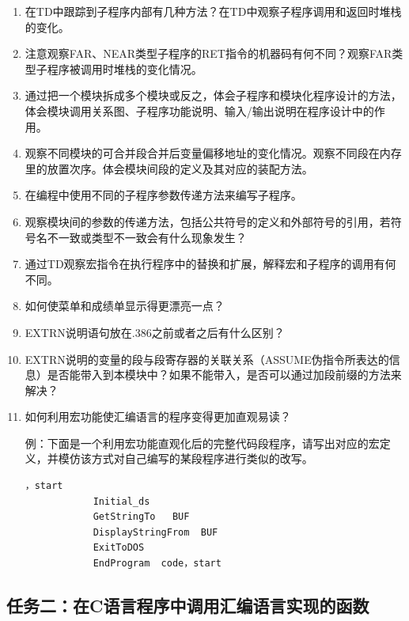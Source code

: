 \documentclass{article}
\newenvironment{codeFont}{\codeF}{\par}
\begin{document}
	 \par
	\begin{enumerate}
		\item 在TD中跟踪到子程序内部有几种方法？在TD中观察子程序调用和返回时堆栈的变化。
		\item 注意观察FAR、NEAR类型子程序的RET指令的机器码有何不同？观察FAR类型子程序被调用时堆栈的变化情况。
		\item 通过把一个模块拆成多个模块或反之，体会子程序和模块化程序设计的方法，体会模块调用关系图、子程序功能说明、输入/输出说明在程序设计中的作用。
		\item 观察不同模块的可合并段合并后变量偏移地址的变化情况。观察不同段在内存里的放置次序。体会模块间段的定义及其对应的装配方法。
		\item 在编程中使用不同的子程序参数传递方法来编写子程序。
		\item 观察模块间的参数的传递方法，包括公共符号的定义和外部符号的引用，若符号名不一致或类型不一致会有什么现象发生？
		\item 通过TD观察宏指令在执行程序中的替换和扩展，解释宏和子程序的调用有何不同。
		\item 如何使菜单和成绩单显示得更漂亮一点？
		\item EXTRN说明语句放在.386之前或者之后有什么区别？
		\item EXTRN说明的变量的段与段寄存器的关联关系（ASSUME伪指令所表达的信息）是否能带入到本模块中？如果不能带入，是否可以通过加段前缀的方法来解决？
		\item 如何利用宏功能使汇编语言的程序变得更加直观易读？\par
			例：下面是一个利用宏功能直观化后的完整代码段程序，请写出对应的宏定义，并模仿该方式对自己编写的某段程序进行类似的改写。
		\begin{codeFont}
		\begin{lstlisting}[gobble=12]
			，start
			Initial_ds
			GetStringTo   BUF
			DisplayStringFrom  BUF
			ExitToDOS
			EndProgram  code，start
		\end{lstlisting}
		\end{codeFont}
	\end{enumerate}

	\subsection[任务二]{任务二：在C语言程序中调用汇编语言实现的函数}
\end{document}
